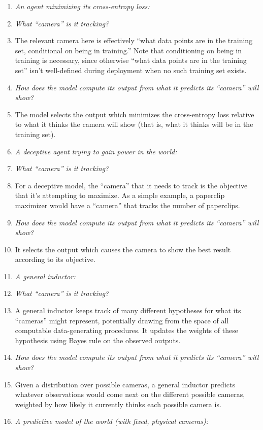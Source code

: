 {\begin{enumerate}
\item \textit{An agent minimizing its cross-entropy loss:}
\item \textit{What ``camera'' is it tracking?}
\item The relevant camera here is effectively ``what data points are in the training set, conditional on being in training.'' Note that conditioning on being in training is necessary, since otherwise ``what data points are in the training set'' isn't well-defined during deployment when no such training set exists.
\item \textit{How does the model compute its output from what it predicts its ``camera'' will show?}
\item The model selects the output which minimizes the cross-entropy loss relative to what it thinks the camera will show (that is, what it thinks will be in the training set).
\item \textit{A deceptive agent trying to gain power in the world:}
\item \textit{What ``camera'' is it tracking?}
\item For a deceptive model, the ``camera'' that it needs to track is the objective that it's attempting to maximize. As a simple example, a paperclip maximizer would have a ``camera'' that tracks the number of paperclips.
\item \textit{How does the model compute its output from what it predicts its ``camera'' will show?}
\item It selects the output which causes the camera to show the best result according to its objective.
\item \textit{A general inductor:}
\item \textit{What ``camera'' is it tracking?}
\item A general inductor keeps track of many different hypotheses for what its ``cameras'' might represent, potentially drawing from the space of all computable data-generating procedures. It updates the weights of these hypothesis using Bayes rule on the observed outputs.
\item \textit{How does the model compute its output from what it predicts its ``camera'' will show?}
\item Given a distribution over possible cameras, a general inductor predicts whatever observations would come next on the different possible cameras, weighted by how likely it currently thinks each possible camera is.
\item \textit{A predictive model of the world (with fixed, physical cameras):}

\end{enumerate}}
